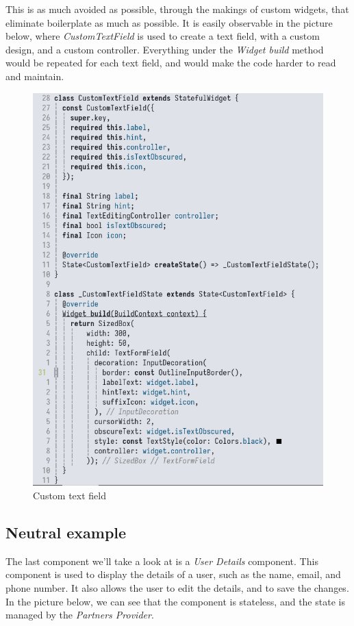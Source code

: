 This is as much avoided as possible, through the makings of custom widgets, that eliminate boilerplate as much as possible.
It is easily observable in the picture below, where \textit{CustomTextField} is used to create a text field, with a custom design, and a custom controller.
Everything under the \textit{Widget build} method would be repeated for each text field, and would make the code harder to read and maintain.
\begin{figure}[htbp]
    \centering
    \includegraphics[scale=0.2]{pictures/it_avoid_boilerplate.png}
    \caption{Custom text field}
    \label{customTextField}
\end{figure}



\newpage
\subsection{Neutral example}
The last component we'll take a look at is a \textit{User Details} component.
This component is used to display the details of a user, such as the name, email, and phone number.
It also allows the user to edit the details, and to save the changes.
In the picture below, we can see that the component is stateless, and the state is managed by the \textit{Partners Provider}.


